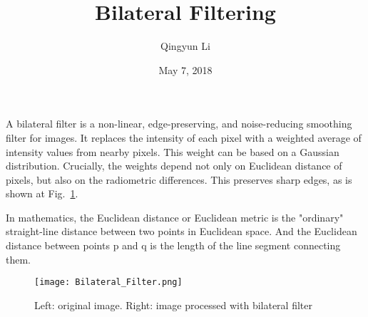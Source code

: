 \documentclass{article}
\author{Qingyun Li}
\date{May 7, 2018}
\title{Bilateral Filtering}
\begin{document}
\maketitle
 \par A bilateral filter is a non-linear, edge-preserving, and noise-reducing smoothing filter for images. It replaces the intensity of each pixel with a weighted average of intensity values from nearby pixels. This weight can be based on a Gaussian distribution. Crucially, the weights depend not only on Euclidean distance of pixels, but also on the radiometric differences. This preserves sharp edges, as is shown at Fig.~\ref{image}.
 \par In mathematics, the Euclidean distance or Euclidean metric is the "ordinary" straight-line distance between two points in Euclidean space. And the Euclidean distance between points p and q is the length of the line segment connecting them.
\begin{figure}[htbp]
\begin{minipage}{1\linewidth}
\centering
\texttt{[image: Bilateral\_Filter.png]}\\
\caption{Left: original image. Right: image processed with bilateral filter}\label{image} 
\end{minipage}
\end{figure}
\end{document}
